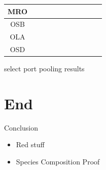 \documentclass[ xcolor = pdftex, dvipsnames, table ]{beamer}
\begin{document}
\begin{frame}
{\begin{tabular}{|c|c|c|c|c|c|c|c|c|c|c|}
        MRO&\cellcolor[HTML]{984EA3}&\cellcolor[HTML]{984EA3}&\cellcolor[HTML]{984EA3}&\cellcolor[HTML]{984EA3}&\cellcolor[HTML]{984EA3}&\cellcolor[HTML]{984EA3}&\cellcolor[HTML]{984EA3}&\cellcolor[HTML]{FF7F00}&\cellcolor[HTML]{984EA3}&\cellcolor[HTML]{984EA3} \\ \hline%
        OSB&\cellcolor[HTML]{FF7F00}&\cellcolor[HTML]{FF7F00}&\cellcolor[HTML]{FF7F00}&\cellcolor[HTML]{FF7F00}&\cellcolor[HTML]{FF7F00}&\cellcolor[HTML]{FF7F00}&\cellcolor[HTML]{FF7F00}&\cellcolor[HTML]{FF7F00}&\cellcolor[HTML]{984EA3}&\cellcolor[HTML]{FF7F00} \\ \hline%
        OLA&\cellcolor[HTML]{FF7F00}&\cellcolor[HTML]{FFFF33}&\cellcolor[HTML]{FF7F00}&\cellcolor[HTML]{FFFF33}&\cellcolor[HTML]{FF7F00}&\cellcolor[HTML]{FFFF33}&\cellcolor[HTML]{FFFF33}&\cellcolor[HTML]{FFFF33}&\cellcolor[HTML]{FF7F00}&\cellcolor[HTML]{FF7F00} \\ \hline%
        OSD&\cellcolor[HTML]{FF7F00}&\cellcolor[HTML]{FFFF33}&\cellcolor[HTML]{FFFF33}&\cellcolor[HTML]{A65628}&\cellcolor[HTML]{FFFF33}&\cellcolor[HTML]{FFFF33}&\cellcolor[HTML]{A65628}&\cellcolor[HTML]{FFFF33}&\cellcolor[HTML]{FFFF33}&\cellcolor[HTML]{FF7F00} \\ \hline%
\end{tabular}}
\end{frame}

%
%

\begin{frame}
\color{red} select port pooling results
\end{frame}


%
%

\section{End}
\begin{frame}{Conclusion}
\begin{itemize}
\item {\color{red}Red stuff}
\item Species Composition Proof
\end{itemize}
\end{frame}

%
%
\end{document}
